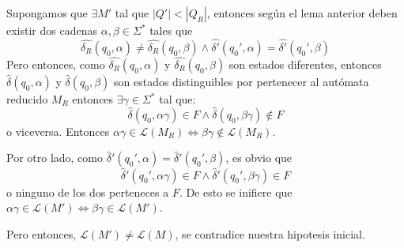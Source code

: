 \begin{demo}[0.8\textwidth]
  Supongamos que \(\exists M'\) tal que \( |Q'| < |Q_R|\), entonces según el lema anterior deben existir dos cadenas \(\alpha,\beta\in\Sigma^*\) tales que
  \[
    \hat{\delta_R}(q_0,\alpha) \neq \hat{\delta_R}(q_0,\beta) \land \hat{\delta'}(q_0',\alpha) = \hat{\delta'}(q_0',\beta)
  \]
  Pero entonces, como \(\hat{\delta_R}(q_0,\alpha)\) y \(\hat{\delta_R}(q_0,\beta)\) son estados diferentes, entonces \(\hat{\delta}(q_0,\alpha)\) y \(\hat{\delta}(q_0,\beta)\) son estados distinguibles por pertenecer al autómata reducido \(M_R\) entonces \(\exists\gamma\in\Sigma^*\) tal que:
  \[
    \hat{\delta}(q_0,\alpha\gamma)\in F \land \hat{\delta}(q_0,\beta\gamma)\notin F
  \]
  o viceversa. Entonces \(\alpha\gamma\in\mathcal{L}(M_R) \iff \beta\gamma\notin\mathcal{L}(M_R)\).

  Por otro lado, como \(\hat\delta'(q_0',\alpha) = \hat\delta'(q_0',\beta)\), es obvio que \[
    \hat\delta'(q_0',\alpha\gamma)\in F\land \hat\delta'(q_0',\beta\gamma)\in F
  \] o ninguno de los dos perteneces a \(F\). De esto se inifiere que \(\alpha\gamma\in\mathcal{L}(M') \iff \beta\gamma\in\mathcal{L}(M')\).

  Pero entonces, \(\mathcal{L}(M') \neq \mathcal{L}(M)\), se contradice nuestra hipotesis inicial.
\end{demo}